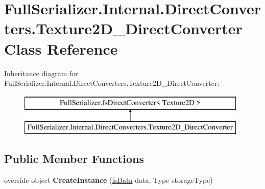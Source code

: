 \hypertarget{class_full_serializer_1_1_internal_1_1_direct_converters_1_1_texture2_d___direct_converter}{}\section{Full\+Serializer.\+Internal.\+Direct\+Converters.\+Texture2\+D\+\_\+\+Direct\+Converter Class Reference}
\label{class_full_serializer_1_1_internal_1_1_direct_converters_1_1_texture2_d___direct_converter}
Inheritance diagram for Full\+Serializer.\+Internal.\+Direct\+Converters.\+Texture2\+D\+\_\+\+Direct\+Converter\+:\begin{figure}[H]
\begin{center}
\leavevmode
\includegraphics[height=2.000000cm]{class_full_serializer_1_1_internal_1_1_direct_converters_1_1_texture2_d___direct_converter}
\end{center}
\end{figure}
\subsection*{Public Member Functions}
\begin{DoxyCompactItemize}
\item 
\mbox{\label{class_full_serializer_1_1_internal_1_1_direct_converters_1_1_texture2_d___direct_converter_aa8e980d9c61e0de1f8b49fd8075d701b}} 
override object {\bfseries Create\+Instance} (\hyperlink{class_full_serializer_1_1fs_data}{fs\+Data} data, Type storage\+Type)
\end{DoxyCompactItemize}
